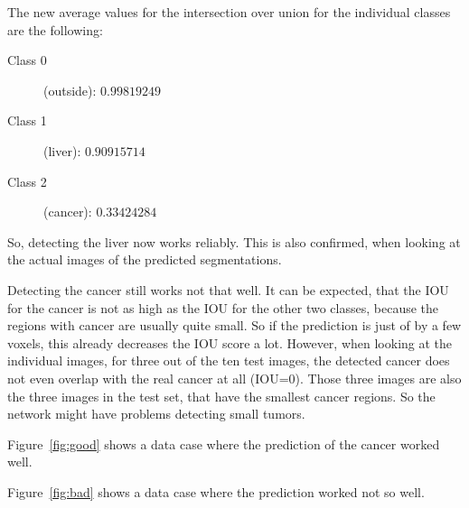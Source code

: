 \documentclass{article}
\begin{document}
		The new average values for the intersection over union for the individual classes are the following:

		\begin{description}
			\item[Class 0] (outside): $0.99819249$
			\item[Class 1] (liver): $0.90915714$
			\item[Class 2] (cancer): $0.33424284$
		\end{description}

		So, detecting the liver now works reliably. This is also confirmed, when looking at the actual images of the predicted segmentations.

		Detecting the cancer still works not that well. It can be expected, that the IOU for the cancer is not as high as the IOU for the other two classes, because the regions with cancer are usually quite small. So if the prediction is just of by a few voxels, this already decreases the IOU score a lot. However, when looking at the individual images, for three out of the ten test images, the detected cancer does not even overlap with the real cancer at all (IOU=$0$). Those three images are also the three images in the test set, that have the smallest cancer regions. So the network might have problems detecting small tumors.

		Figure~\ref{fig:good} shows a data case where the prediction of the cancer worked well.

		Figure~\ref{fig:bad} shows a data case where the prediction worked not so well. 
\end{document}
